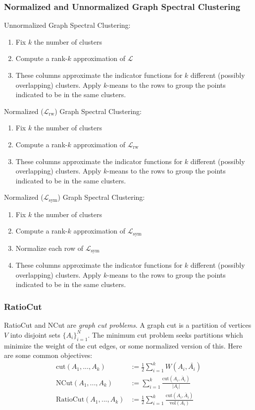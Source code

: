 \documentclass{article}
\begin{document}
\subsubsection*{Normalized and Unnormalized Graph Spectral Clustering}
Unnormalized Graph Spectral Clustering:
\begin{enumerate}
    \item Fix $k$ the number of clusters
    \item Compute a rank-$k$ approximation of $\mathcal{L}$
    \item These columns approximate the indicator functions for $k$ different (possibly overlapping) clusters. Apply $k$-means to the rows to group the points indicated to be in the same clusters. 
\end{enumerate}
Normalized ($\mathcal{L}_{\text{rw}}$) Graph Spectral Clustering:
\begin{enumerate}
    \item Fix $k$ the number of clusters
    \item Compute a rank-$k$ approximation of $\mathcal{L}_{\text{rw}}$
    \item These columns approximate the indicator functions for $k$ different (possibly overlapping) clusters. Apply $k$-means to the rows to group the points indicated to be in the same clusters. 
\end{enumerate}
Normalized ($\mathcal{L}_{\text{sym}}$) Graph Spectral Clustering:
\begin{enumerate}
    \item Fix $k$ the number of clusters
    \item Compute a rank-$k$ approximation of $\mathcal{L}_{\text{sym}}$
    \item Normalize each row of $\mathcal{L}_{\text{sym}}$
    \item These columns approximate the indicator functions for $k$ different (possibly overlapping) clusters. Apply $k$-means to the rows to group the points indicated to be in the same clusters. 
\end{enumerate}

\subsubsection*{RatioCut}

RatioCut and NCut are \textit{graph cut problems}. A graph cut is a partition of vertices $V$ into disjoint sets $\{A_i\}_{i=1}^N$. The minimum cut problem seeks partitions which minimize the  weight of the cut edges, or some normalized version of this. Here are some common objectives:
\begin{align}
    \text{cut}(A_1, ..., A_k) & := \frac{1}{2} \sum_{i = 1}^k W(A_i, \bar{A_i}) \\
    \text{NCut}(A_1, ..., A_k) & := \sum_{i=1}^k \frac{\text{cut}(A_i, \bar{A}_i)}{|A_i|} \\
    \text{RatioCut}(A_1, ..., A_k) & := \frac{1}{2} \sum_{i=1}^k \frac{\text{cut}(A_i, \bar{A}_i)}{\text{vol}(A_i)}
\end{align}
\end{document}
